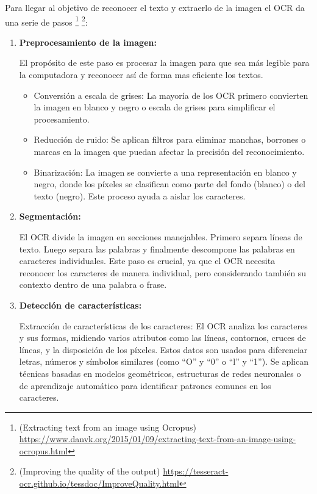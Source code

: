 Para llegar al objetivo de reconocer el texto y extraerlo de la imagen el OCR da una serie de pasos	\footnote{(Extracting text from an image using Ocropus) \url{https://www.danvk.org/2015/01/09/extracting-text-from-an-image-using-ocropus.html} }	\footnote{(Improving the quality of the output) \url{https://tesseract-ocr.github.io/tessdoc/ImproveQuality.html} }:
\begin{enumerate}
	\item \textbf{Preprocesamiento de la imagen:}
	
	El propósito de este paso es procesar la imagen para que sea más legible para la computadora y reconocer así de forma mas eficiente los textos.
	\begin{itemize}
		\item Conversión a escala de grises: La mayoría de los OCR primero convierten la imagen en blanco y negro o escala de grises para simplificar el procesamiento.
		\item Reducción de ruido: Se aplican filtros para eliminar manchas, borrones o marcas en la imagen que puedan afectar la precisión del reconocimiento.
		\item Binarización: La imagen se convierte a una representación en blanco y negro, donde los píxeles se clasifican como parte del fondo (blanco) o del texto (negro). Este proceso ayuda a aislar los caracteres.
	\end{itemize}
	
	\item \textbf{Segmentación:}
	
	El OCR divide la imagen en secciones manejables. Primero separa líneas de texto.  Luego separa las palabras y finalmente descompone las palabras en caracteres individuales. Este paso es crucial, ya que el OCR necesita reconocer los caracteres de manera individual, pero considerando también su contexto dentro de una palabra o frase.
	
	\item \textbf{Detección de características:}
	
	Extracción de características de los caracteres: El OCR analiza los caracteres y sus formas, midiendo varios atributos como las líneas, contornos, cruces de líneas, y la disposición de los píxeles. Estos datos son usados para diferenciar letras, números y símbolos similares (como ``O'' y ``0'' o ``l'' y ``1'').
	Se aplican técnicas basadas en modelos geométricos, estructuras de redes neuronales o de aprendizaje automático para identificar patrones comunes en los caracteres.
	

\end{enumerate}
